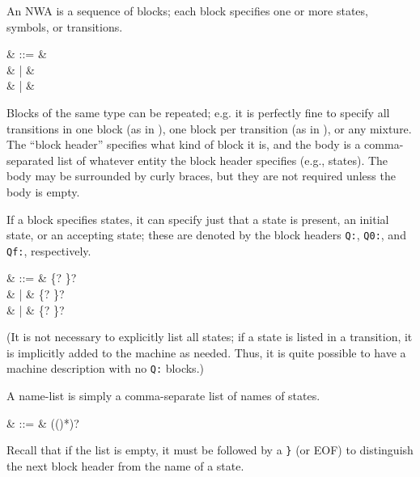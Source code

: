 An NWA is a sequence of blocks; each block specifies one or more
states, symbols, or transitions.

\begin{grammar}
   &  ::= &  \\
                  &    | &  \\
                  &    | & 
\end{grammar}

Blocks of the same type can be repeated; e.g. it is perfectly fine to
specify all transitions in one block (as in ),
one block per transition (as in ), or
any mixture. The ``block header'' specifies what kind of block
it is, and the body is a comma-separated list of whatever entity the
block header specifies (e.g., states). The body may be surrounded by
curly braces, but they are not required unless the body is empty.

If a block specifies states, it can specify just that a state is
present, an initial state, or an accepting state; these are denoted by
the block headers \texttt{Q:}, \texttt{Q0:}, and \texttt{Qf:},
respectively.
 
\begin{grammar}
   &  ::= &  \cfgsp \term\{? \cfgsp {}\cfgsp\term\}? \\
                        &   |  & \cfgsp \term\{? \cfgsp {}\cfgsp\term\}? \\
                        &   |  & \cfgsp \term\{? \cfgsp {}\cfgsp\term\}?
\end{grammar}

(It is not necessary to explicitly list all states; if a state is
listed in a transition, it is implicitly added to the machine as
needed. Thus, it is quite possible to have a machine description with
no \texttt{Q:} blocks.)

A name-list is simply a comma-separate list of names of states.

\begin{grammar}
   & ::= & (\cfgsp (\term{,}\cfgsp  {})*)?
\end{grammar}

Recall that if the list is empty, it must be followed by a \texttt{\}}
(or EOF) to distinguish the next block header from the name of a
state.


